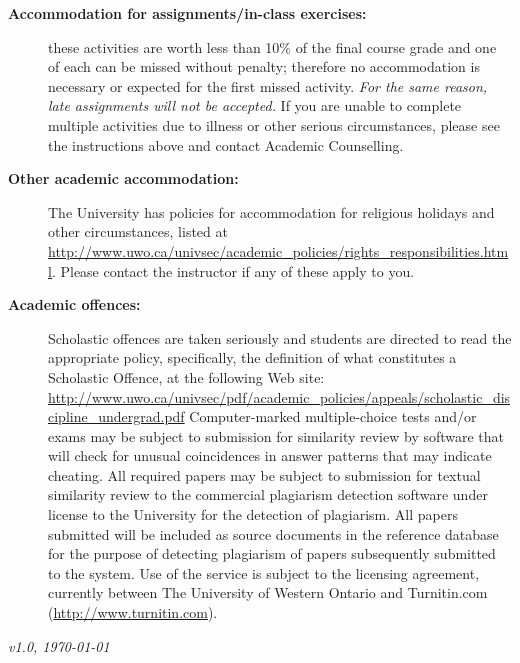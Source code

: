 \documentclass[12pt]{article}
\begin{document}
\begin{description}
\item[\bf Accommodation for assignments/in-class exercises:] these activities are worth less than 10\% of the
final course grade and one of each can be missed without penalty; therefore no accommodation is necessary or expected
for the first missed activity. {\em For the same reason, late assignments will not be accepted.} If you are unable
to complete multiple activities due to illness or other serious circumstances, please see the instructions above 
and contact Academic Counselling.

\item[\bf Other academic accommodation:] The University has policies for accommodation for religious holidays and other circumstances,
listed at \url{http://www.uwo.ca/univsec/academic_policies/rights_responsibilities.html}. Please contact the instructor if any of these apply to you.

\item[\bf Academic offences:] Scholastic offences are taken seriously and students are directed to read the
appropriate policy, specifically, the definition of what constitutes a Scholastic Offence, at the
following Web site:
\url{http://www.uwo.ca/univsec/pdf/academic_policies/appeals/scholastic_discipline_undergrad.pdf}
Computer-marked multiple-choice tests and/or exams may be subject to submission for similarity review by software that will check for unusual coincidences in answer patterns that may indicate cheating.
All required papers may be subject to submission for textual similarity review to the commercial plagiarism detection software under license to the University for the detection of plagiarism. All papers submitted will be included as source documents in the reference database for the purpose of detecting plagiarism of papers subsequently submitted to the system. Use of the service is subject to the licensing agreement, currently between The University of Western Ontario and Turnitin.com (\url{http://www.turnitin.com}).
\end{description}

{\em v1.0, \today}
\end{document}
